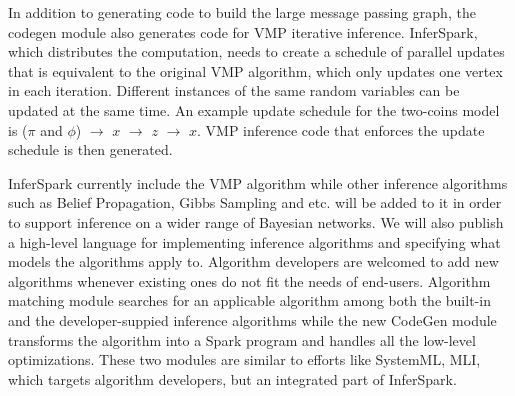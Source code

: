 
In addition to generating code to build the large message passing graph,
the codegen module also generates code for VMP iterative inference. 
InferSpark, which
distributes the computation, needs to create a schedule of parallel updates
that is equivalent to the original VMP algorithm, which only updates one vertex
in each iteration.  Different instances of the same random variables can be
updated at the same time. An example update schedule for the two-coins model is
($\pi$ and $\phi$) $\rightarrow$ $x$ $\rightarrow$ $z$ $\rightarrow$ $x$. VMP inference code that enforces the update
schedule is then generated. %

InferSpark currently include the VMP algorithm while other inference algorithms
such as Belief Propagation, Gibbs Sampling and etc. will be added to it in
order to support inference on a wider range of Bayesian networks. We will also
publish a high-level language for implementing inference algorithms and
specifying what models the algorithms apply to.  Algorithm developers are
welcomed to add new algorithms whenever existing ones do not fit the needs of
end-users. Algorithm matching module searches for an applicable algorithm among
both the built-in and the developer-suppied inference algorithms while the new
CodeGen module transforms the algorithm into a Spark program and handles all
the low-level optimizations. These two modules are similar to efforts like
SystemML, MLI, which targets algorithm developers, but an integrated part of
InferSpark.

